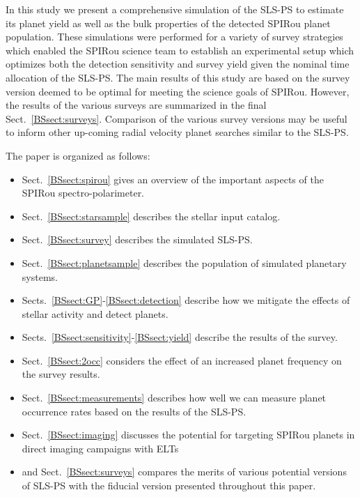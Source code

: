 In this study we present a comprehensive simulation of the SLS-PS to estimate its
planet yield as well as the bulk properties of the detected SPIRou planet population.
These simulations were performed for a variety
of survey strategies which enabled the SPIRou science team to establish an
experimental setup which optimizes both the detection sensitivity and survey
yield given the nominal time allocation of the SLS-PS. The main results of this
study are based on the survey version deemed to be optimal for meeting the 
science goals of SPIRou. However, the results of the
various surveys are summarized in the final Sect.~\ref{BSsect:surveys}. Comparison
of the various survey versions may be useful to inform other up-coming radial velocity
planet searches similar to the SLS-PS.

The paper is organized as follows:

\begin{itemize}
\item Sect.~\ref{BSsect:spirou} gives an overview of the important aspects of the
  SPIRou spectro-polarimeter.
\item Sect.~\ref{BSsect:starsample} describes the stellar input catalog.
\item Sect.~\ref{BSsect:survey} describes the simulated SLS-PS.
\item Sect.~\ref{BSsect:planetsample} describes the population of simulated
  planetary systems. 
\item Sects.~\ref{BSsect:GP}-\ref{BSsect:detection} describe how we mitigate the
  effects of stellar activity and detect planets.
\item Sects.~\ref{BSsect:sensitivity}-\ref{BSsect:yield} describe the results of
  the survey.
\item Sect.~\ref{BSsect:2occ} considers the effect of an increased planet frequency
  on the survey results.
\item Sect.~\ref{BSsect:measurements} describes how well we can measure
  planet occurrence rates based on the results of the SLS-PS.
\item Sect.~\ref{BSsect:imaging} discusses the potential for targeting SPIRou
  planets in direct imaging campaigns with ELTs
\item and Sect.~\ref{BSsect:surveys} compares the merits of various potential
  versions of SLS-PS with the fiducial version presented throughout this paper.
\end{itemize}

